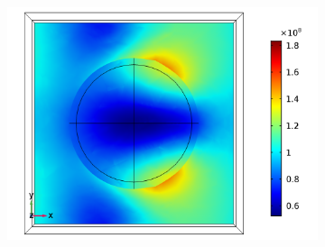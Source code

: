 \begin{figure}[htb!]
\begin{subfigure}{0.32\textwidth}
   \end{subfigure}
   \begin{subfigure}{0.32\textwidth}
        \centering
        \includegraphics[width=\linewidth]{figures/ch4/S5A/FieldDistribution/Sample5A_TE_Slice@z=-05t_wl=330_notitle.png}
   \end{subfigure}


\end{figure}
